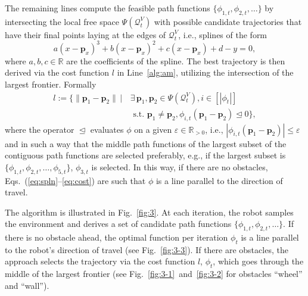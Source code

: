 \documentclass[letterpaper,10pt,conference,twoside]{IEEEtran}
\theoremstyle{definition}
\begin{document}
The remaining lines %
compute the feasible path functions $\{\phi_{1,t},\phi_{2,t},\dots\}$ by intersecting the local free space $\Psi(\mathcal{Q}^V_t)$ with possible candidate trajectories that have their final points laying at the edges of $\mathcal{Q}^V_t$, i.e., splines of the form
\begin{equation}\label{eq:spln}
  a(x-\mathbf{p}_x)^3+b(x-\mathbf{p}_x)^2+c(x-\mathbf{p}_x)+d-y=0,
\end{equation}
where $a,b,c\in\mathbb{R}$ are the coefficients of the spline. 
The best trajectory is then derived via the cost function $l$ in Line~\ref{alg:am}, utilizing the intersection of the largest frontier. Formally
\begin{equation}\label{eq:cost}\begin{split} 
  l:=\bigl\{\lVert \mathbf{p}_1-\mathbf{p}_2\rVert\,|\,&\exists\,\mathbf{p}_1,\mathbf{p}_2\in\Psi(\mathcal{Q}_t^V),i\in[|\phi_t|]\\
  &\text{ s.t. }\mathbf{p}_1\neq\mathbf{p}_2,\phi_{i,t}(\mathbf{p}_1-\mathbf{p}_2)\trianglelefteq 0\bigr\},
\end{split}\end{equation}
where the operator $\trianglelefteq$ evaluates $\phi$ on a given $\varepsilon\in\mathbb{R}_{>0}$, i.e., $|\phi_{i,t}(\mathbf{p}_1-\mathbf{p}_2)|\leq\varepsilon$ and in such a way that the middle path functions of the largest subset of the contiguous path functions are selected preferably, e.g., if the largest subset is $\{\phi_{1,t},\phi_{2,t},\dots,\phi_{5,t}\}$, $\phi_{3,t}$ is selected.
In this way, if there are no obstacles, Eqs.~(\ref{eq:spln}--\ref{eq:cost}) are such that $\phi$ is a line parallel to the direction of travel. 

The algorithm is illustrated in Fig.~\ref{fig:3}. At each iteration, the robot samples the environment and derives a set of %
candidate path functions $\{\phi_{1,t},\phi_{2,t},\dots\}$. If there is no obstacle ahead, the optimal function per iteration $\phi_t$ is a line parallel to the robot's direction of travel (see Fig.~\ref{fig:3-3}). If there are obstacles, the %
approach selects the trajectory via the cost function $l$, $\phi_t$, which goes through the middle of the largest frontier (see Fig.~\ref{fig:3-1}~and~\ref{fig:3-2} for %
obstacles ``wheel'' and ``wall'').
\end{document}
